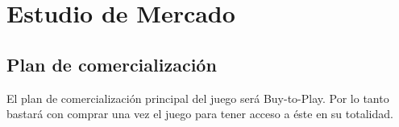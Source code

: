 \section{Estudio de Mercado}

\subsection{Plan de comercialización}

El plan de comercialización principal del juego será Buy-to-Play. Por lo tanto
bastará con comprar una vez el juego para tener acceso a éste en su totalidad.



